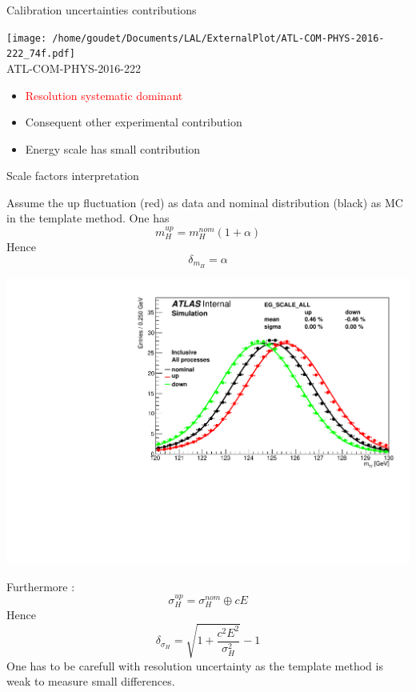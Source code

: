 \begin{frame}{Calibration uncertainties contributions}
  \begin{minipage}{0.49\linewidth}
    \texttt{[image: /home/goudet/Documents/LAL/ExternalPlot/ATL-COM-PHYS-2016-222\_74f.pdf]}\\
    \centering
    ATL-COM-PHYS-2016-222
  \end{minipage}
  \begin{minipage}{0.49\linewidth}
    \begin{itemize}
    \item \textcolor{red}{Resolution systematic dominant}
    \item Consequent other experimental contribution
    \item Energy scale has small contribution
    \end{itemize}
  \end{minipage}
\end{frame}

\begin{frame}{Scale factors interpretation}
  \begin{minipage}{0.49\linewidth}
    Assume the up fluctuation (red) as data and nominal distribution (black) as MC in the template method.
    One has
    $$m_H^{up}=m_H^{nom}(1+\alpha)$$
    Hence
    $$\delta_{m_H}=\alpha$$
    \end{minipage}
  \begin{minipage}{0.49\linewidth}
    \includegraphics[width=\linewidth]{plots/Backup/h013_EG_SCALE_ALL_0.pdf}
  \end{minipage}
  Furthermore :
  $$\sigma_H^{up}=\sigma_H^{nom} \oplus cE$$
  Hence
  $$\delta_{\sigma_H} = \sqrt{1+\frac{c^2E^2}{\sigma_H^2}}-1$$
  One has to be carefull with resolution uncertainty as the template method is weak to measure small differences.
\end{frame}
